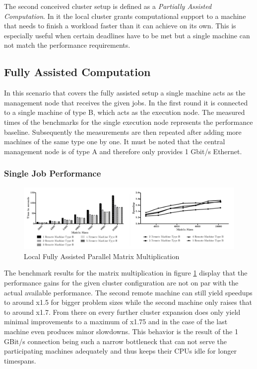 The second conceived cluster setup is defined as a \textit{Partially Assisted Computation}. In it the local cluster grants computational support to a machine that needs to finish a workload faster than it can achieve on its own. This is especially useful when certain deadlines have to be met but a single machine can not match the performance requirements.
\subsection{Fully Assisted Computation}
In this scenario that covers the fully assisted setup a single machine acts as the management node that receives the given jobs. In the first round it is connected to a single machine of type B, which acts as the execution node. The measured times of the benchmarks for the single execution node represents the performance baseline. Subsequently the measurements are then repeated after adding more machines of the same type one by one. It must be noted that the central management node is of type A and therefore only provides 1 Gbit/s Ethernet.

\subsubsection*{Single Job Performance}

\begin{figure}[!htb]
	
	\includegraphics[width=1.0\textwidth]{images/local_fully_assisted_matrix.pdf}
	\centering
	\caption{Local Fully Assisted Parallel Matrix Multiplication}
	\label{img:fully_assisted_parallel_matrix}
\end{figure}

The benchmark results for the matrix multiplication in figure \ref{img:fully_assisted_parallel_matrix} display that the performance gains for the given cluster configuration are not on par with the actual available performance. The second remote machine can still yield speedups to around x1.5 for bigger problem sizes while the second machine only raises that to around x1.7. From there on every further cluster expansion does only yield minimal improvements to a maximum of x1.75 and in the case of the last machine even produces minor slowdowns. This behavior is the result of the 1 GBit/s connection being such a narrow bottleneck that can not serve the participating machines adequately and thus keeps their CPUs idle for longer timespans.  

